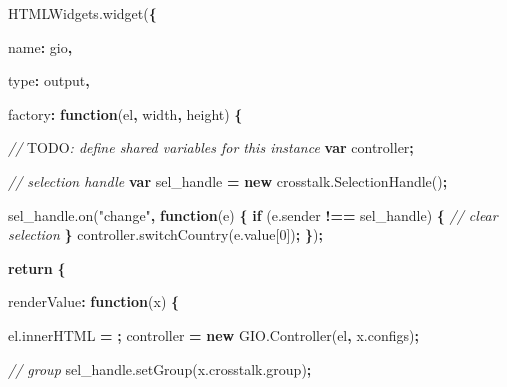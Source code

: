 \documentclass[
  10pt,
]{krantz}
\makeatletter
\newenvironment{Shaded}{\begin{snugshade}}{\end{snugshade}}
\newcommand{\AlertTok}[1]{\textcolor[rgb]{0.33,0.33,0.33}{#1}}
\newcommand{\AttributeTok}[1]{\textcolor[rgb]{0.61,0.61,0.61}{#1}}
\newcommand{\CommentTok}[1]{\textcolor[rgb]{0.37,0.37,0.37}{\textit{#1}}}
\newcommand{\ControlFlowTok}[1]{\textcolor[rgb]{0.27,0.27,0.27}{\textbf{#1}}}
\newcommand{\DataTypeTok}[1]{\textcolor[rgb]{0.27,0.27,0.27}{#1}}
\newcommand{\DecValTok}[1]{\textcolor[rgb]{0.06,0.06,0.06}{#1}}
\newcommand{\KeywordTok}[1]{\textcolor[rgb]{0.27,0.27,0.27}{\textbf{#1}}}
\newcommand{\NormalTok}[1]{#1}
\newcommand{\OperatorTok}[1]{\textcolor[rgb]{0.43,0.43,0.43}{\textbf{#1}}}
\newcommand{\StringTok}[1]{\textcolor[rgb]{0.5,0.5,0.5}{#1}}
\newcommand{\VariableTok}[1]{\textcolor[rgb]{0,0,0}{#1}}
\newenvironment{kframe}{%
\medskip{}
\setlength{\fboxsep}{.8em}
 \def\at@end@of@kframe{}%
 \ifinner\ifhmode%
  \def\at@end@of@kframe{\end{minipage}}%
  \begin{minipage}{\columnwidth}%
 \fi\fi%
 \def\FrameCommand##1{\hskip\@totalleftmargin \hskip-\fboxsep
 \colorbox{shadecolor}{##1}\hskip-\fboxsep
     \hskip-\linewidth \hskip-\@totalleftmargin \hskip\columnwidth}%
 \MakeFramed {\advance\hsize-\width
   \@totalleftmargin\z@ \linewidth\hsize
   \@setminipage}}%
 {\par\unskip\endMakeFramed%
 \at@end@of@kframe}
\renewenvironment{Shaded}{\begin{kframe}}{\end{kframe}}
\makeatother
\begin{document}
\begin{Shaded}
\begin{Highlighting}[]
\VariableTok{HTMLWidgets}\NormalTok{.}\AttributeTok{widget}\NormalTok{(}\OperatorTok{\{}

  \DataTypeTok{name}\OperatorTok{:} \StringTok{\textquotesingle{}gio\textquotesingle{}}\OperatorTok{,}

  \DataTypeTok{type}\OperatorTok{:} \StringTok{\textquotesingle{}output\textquotesingle{}}\OperatorTok{,}

  \DataTypeTok{factory}\OperatorTok{:} \KeywordTok{function}\NormalTok{(el}\OperatorTok{,}\NormalTok{ width}\OperatorTok{,}\NormalTok{ height) }\OperatorTok{\{}

    \CommentTok{// }\AlertTok{TODO}\CommentTok{: define shared variables for this instance}
    \KeywordTok{var}\NormalTok{ controller}\OperatorTok{;}

    \CommentTok{// selection handle}
    \KeywordTok{var}\NormalTok{ sel\_handle }\OperatorTok{=} \KeywordTok{new} \VariableTok{crosstalk}\NormalTok{.}\AttributeTok{SelectionHandle}\NormalTok{()}\OperatorTok{;}

    \VariableTok{sel\_handle}\NormalTok{.}\AttributeTok{on}\NormalTok{(}\StringTok{"change"}\OperatorTok{,} \KeywordTok{function}\NormalTok{(e) }\OperatorTok{\{}
      \ControlFlowTok{if}\NormalTok{ (}\VariableTok{e}\NormalTok{.}\AttributeTok{sender} \OperatorTok{!==}\NormalTok{ sel\_handle) }\OperatorTok{\{}
        \CommentTok{// clear selection}
      \OperatorTok{\}}
      \VariableTok{controller}\NormalTok{.}\AttributeTok{switchCountry}\NormalTok{(}\VariableTok{e}\NormalTok{.}\AttributeTok{value}\NormalTok{[}\DecValTok{0}\NormalTok{])}\OperatorTok{;}
    \OperatorTok{\}}\NormalTok{)}\OperatorTok{;}


    \ControlFlowTok{return} \OperatorTok{\{}

      \DataTypeTok{renderValue}\OperatorTok{:} \KeywordTok{function}\NormalTok{(x) }\OperatorTok{\{}

        \VariableTok{el}\NormalTok{.}\AttributeTok{innerHTML} \OperatorTok{=} \StringTok{\textquotesingle{}\textquotesingle{}}\OperatorTok{;}
\NormalTok{        controller }\OperatorTok{=} \KeywordTok{new} \VariableTok{GIO}\NormalTok{.}\AttributeTok{Controller}\NormalTok{(el}\OperatorTok{,} \VariableTok{x}\NormalTok{.}\AttributeTok{configs}\NormalTok{)}\OperatorTok{;}

        \CommentTok{// group}
        \VariableTok{sel\_handle}\NormalTok{.}\AttributeTok{setGroup}\NormalTok{(}\VariableTok{x}\NormalTok{.}\VariableTok{crosstalk}\NormalTok{.}\AttributeTok{group}\NormalTok{)}\OperatorTok{;}
        

\end{Highlighting}
\end{Shaded}
\end{document}
